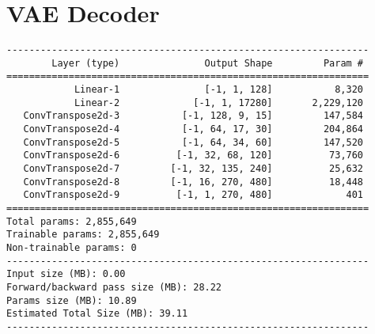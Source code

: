\section{VAE Decoder}
\label{app:vae_decoder}
\begin{verbatim}
----------------------------------------------------------------
        Layer (type)               Output Shape         Param #
================================================================
            Linear-1               [-1, 1, 128]           8,320
            Linear-2             [-1, 1, 17280]       2,229,120
   ConvTranspose2d-3           [-1, 128, 9, 15]         147,584
   ConvTranspose2d-4           [-1, 64, 17, 30]         204,864
   ConvTranspose2d-5           [-1, 64, 34, 60]         147,520
   ConvTranspose2d-6          [-1, 32, 68, 120]          73,760
   ConvTranspose2d-7         [-1, 32, 135, 240]          25,632
   ConvTranspose2d-8         [-1, 16, 270, 480]          18,448
   ConvTranspose2d-9          [-1, 1, 270, 480]             401
================================================================
Total params: 2,855,649
Trainable params: 2,855,649
Non-trainable params: 0
----------------------------------------------------------------
Input size (MB): 0.00
Forward/backward pass size (MB): 28.22
Params size (MB): 10.89
Estimated Total Size (MB): 39.11
----------------------------------------------------------------
\end{verbatim}

\newpage
